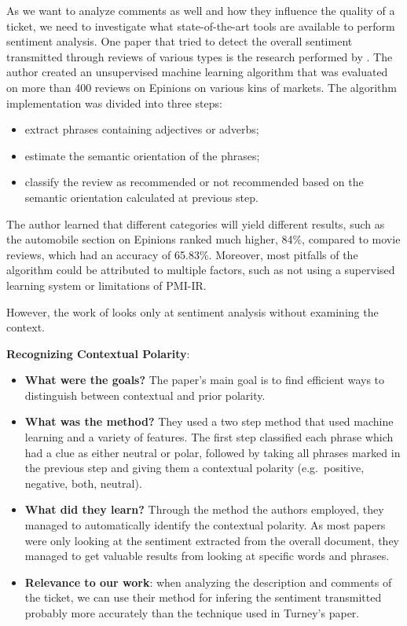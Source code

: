 \documentclass{mprop}
\begin{document}
As we want to analyze comments as well and how they influence the quality of a ticket, we
need to investigate what state-of-the-art tools are available to perform sentiment analysis.
One paper that tried to detect the overall sentiment transmitted through reviews of various 
types is the research performed by \citet{turney2002thumbs}. The author created an unsupervised
machine learning algorithm that was evaluated on more than 400 reviews on Epinions on various
kins of markets. The algorithm implementation was divided into three steps:
  \begin{itemize}
    \item extract phrases containing adjectives or adverbs;
    \item estimate the semantic orientation of the phrases;
    \item classify the review as recommended or not recommended based on
      the semantic orientation calculated at previous step.
  \end{itemize}
The author learned that different categories will yield different results, such as the
automobile section on Epinions ranked much higher, 84\%, compared to movie reviews, which
had an accuracy of 65.83\%. Moreover, most pitfalls of the algorithm could be attributed
to multiple factors, such as not using a supervised learning system or limitations of 
PMI-IR.

However, the work of \citet{turney2002thumbs} looks only at sentiment analysis without
examining the context. 

\textbf{Recognizing Contextual Polarity}\cite{wilson2005recognizing}:
\begin{itemize}
  \item \textbf{What were the goals?}
    The paper's main goal is to find efficient ways to distinguish between 
    contextual and prior polarity.
  \item \textbf{What was the method?}
    They used a two step method that used machine learning and a variety of
    features. The first step classified each phrase which had a clue as either
    neutral or polar, followed by taking all phrases marked in the previous step
    and giving them a contextual polarity (e.g.\ positive, negative, 
    both, neutral).
  \item \textbf{What did they learn?}
    Through the method the authors employed, they managed to automatically 
    identify the contextual polarity. As most papers were only looking at the 
    sentiment extracted from the overall document, they managed to get valuable 
    results from looking at specific words and phrases.
  \item \textbf{Relevance to our work}: when analyzing the description and
    comments of the ticket, we can use their method for infering the sentiment 
    transmitted probably more accurately than the technique used in 
    Turney's paper\cite{turney2002thumbs}.
\end{itemize}
\end{document}
